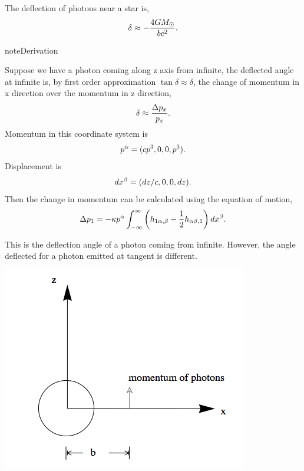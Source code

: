 \documentclass[letterpaper,12pt,english]{sphinxmanual}
\begin{document}
The deflection of photons near a star is,
\begin{gather}
\begin{split}\delta \approx - \frac{4G M_\odot}{bc^2}.\end{split}\notag
\end{gather}
\begin{notice}{note}{Derivation}

Suppose we have a photon coming along z axis from infinite, the deflected angle at infinite is, by first order approximation \(\tan\delta \approx \delta\), the change of momentum in x direction over the momentum in z direction,
\begin{gather}
\begin{split}\delta \approx \frac{\Delta p_x}{p_z}.\end{split}\notag
\end{gather}
Momentum in this coordinate system is
\begin{gather}
\begin{split}p^\alpha = (c p^3, 0, 0, p^3).\end{split}\notag
\end{gather}
Displacement is
\begin{gather}
\begin{split}dx^\beta = (dz/c,0,0,dz).\end{split}\notag
\end{gather}
Then the change in momentum can be calculated using the equation of motion,
\begin{gather}
\begin{split}\Delta p_1 = - \kappa p^\alpha \int_{-\infty}^{\infty} \left( h_{1\alpha,\beta} - \frac{1}{2} h_{\alpha\beta,1} \right) dx^\beta.\end{split}\notag
\end{gather}\end{notice}

This is the deflection angle of a photon coming from infinite. However, the angle deflected for a photon emitted at tangent is different.

{\hfill\includegraphics{tangentNeutrinoGravitation.png}\hfill}
\end{document}
